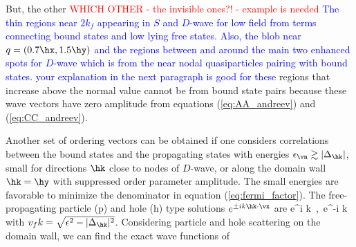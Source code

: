 \documentclass[prb,aps,showpacs,amsmath,twocolumn,10pt]{revtex4-1}
\newcommand{\blue}{\textcolor{blue}}
\newcommand{\red}{\textcolor{red}}
\begin{document}
But, the other \red{WHICH OTHER - the invisible ones?! - example is needed} \blue{The thin regions near $2k_f$ appearing in $S$ and $D$-wave for low field from terms connecting bound states and low lying free states. Also, the blob near $q=(0.7\hx,1.5\hy)$ and the regions between and around the main two enhanced spots for $D$-wave which is from the near nodal quasiparticles pairing with bound states. your explanation in the next paragraph is good for these} regions that increase above the normal
value cannot be from bound state pairs because these wave vectors have zero
amplitude from equations (\ref{eq:AA_andreev}) and (\ref{eq:CC_andreev}). 

Another set of ordering vectors can be obtained if one considers correlations between 
the bound states and the propagating states with energies 
$\epsilon_{\vn} \gtrsim |\Delta_{\hk}|$, small for 
directions $\hk$ close to nodes of $D$-wave, or along the domain wall $\hk = \hy$ with 
suppressed order parameter amplitude. The small energies are favorable 
to minimize the denominator in equation
(\ref{eq:fermi_factor}). The free-propagating particle (p) and hole (h) type 
solutions $e^{\pm i k \hk\cdot \vx}$ are  
\be
\label{eq:uv_andreev_free}
\left[ \begin{array}{c}
u_{\hk,n} \\ v_{\hk,n}
\end{array} \right] %
\propto %
e^{i k \hk\cdot \vx}
\,,\,
e^{-i k \hk\cdot \vx}
\ee
with $ v_f k = \sqrt{\epsilon^2 - |\Delta_{\hk}|^2}$. 
Considering particle and hole scattering on the domain wall, we can find the exact wave functions of 
\end{document}
